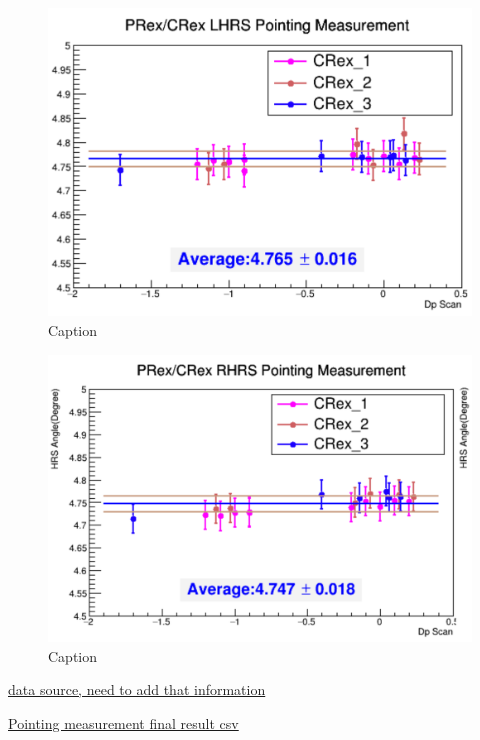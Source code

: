 \begin{figure}[h]
    \centering
    \includegraphics[width =\textwidth]{images/chap4/lhrs_pointing_summary.png}
    \caption{Caption}
    \label{fig:my_label}
\end{figure}

\begin{figure}[h]
    \centering
    \includegraphics[width =\textwidth]{images/chap4/rhrs_pointing_summary.png}
    \caption{Caption}
    \label{fig:my_label}
\end{figure}

\href{https://docs.google.com/spreadsheets/d/12B7BL0aG4ZT-L9QYeQnX1PDxArS75PFv40Hdc3eRv4k/edit?usp=sharing}{data source, need to add that information}

\href{https://github.com/Jiansiyu/GeneralScripts/blob/master/PointingCheck/crex_pointing.csv}{Pointing measurement final result csv}


